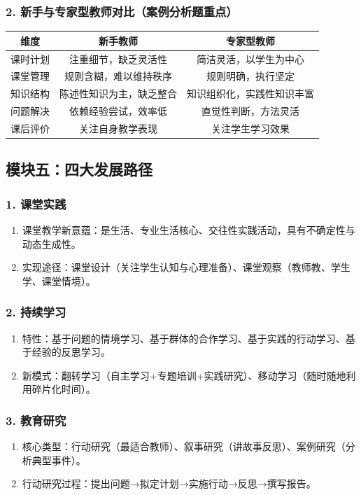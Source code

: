 \documentclass[12pt,a4paper]{article}
\begin{document}
\subsubsection{2. 新手与专家型教师对比（案例分析题重点）}
\begin{longtable}{|c|c|c|}
\hline
\textbf{维度} & \textbf{新手教师} & \textbf{专家型教师} \\
\hline
课时计划 & 注重细节，缺乏灵活性 & 简洁灵活，以学生为中心 \\
\hline
课堂管理 & 规则含糊，难以维持秩序 & 规则明确，执行坚定 \\
\hline
知识结构 & 陈述性知识为主，缺乏整合 & 知识组织化，实践性知识丰富 \\
\hline
问题解决 & 依赖经验尝试，效率低 & 直觉性判断，方法灵活 \\
\hline
课后评价 & 关注自身教学表现 & 关注学生学习效果 \\
\hline
\end{longtable}

\subsection{模块五：四大发展路径}
\subsubsection{1. 课堂实践}
\begin{enumerate}[label=•,itemsep=0.5ex]
\item 课堂教学新意蕴：是生活、专业生活核心、交往性实践活动，具有不确定性与动态生成性。
\item 实现途径：课堂设计（关注学生认知与心理准备）、课堂观察（教师教、学生学、课堂情境）。
\end{enumerate}

\subsubsection{2. 持续学习}
\begin{enumerate}[label=•,itemsep=0.5ex]
\item 特性：基于问题的情境学习、基于群体的合作学习、基于实践的行动学习、基于经验的反思学习。
\item 新模式：翻转学习（自主学习+专题培训+实践研究）、移动学习（随时随地利用碎片化时间）。
\end{enumerate}

\subsubsection{3. 教育研究}
\begin{enumerate}[label=1.,itemsep=0.3ex]
\item 核心类型：行动研究（最适合教师）、叙事研究（讲故事反思）、案例研究（分析典型事件）。
\item 行动研究过程：提出问题→拟定计划→实施行动→反思→撰写报告。
\end{enumerate}
\end{document}
